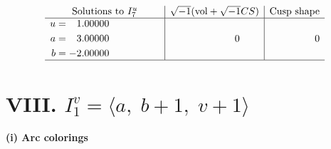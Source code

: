\documentclass[1p]{elsarticle_modified}
\theoremstyle{definition}
\newcommand{\I}{\sqrt{-1}}
\begin{document}
$$\begin{array}{c|c|c}  
\text{Solutions to }I^u_{7}& \I (\text{vol} + \sqrt{-1}CS) & \text{Cusp shape}\\
 \hline 
\begin{aligned}
u &= \phantom{-}1.00000\phantom{ +0.000000I} \\
a &= \phantom{-}3.00000\phantom{ +0.000000I} \\
b &= -2.00000\phantom{ +0.000000I}\end{aligned}
 & \phantom{-0.000000 } 0 & \phantom{-0.000000 } 0\\
 \hline 
 \end{array}$$\newpage\newpage\renewcommand{\arraystretch}{1}
\centering \section*{VIII. $I^v_{1}= \langle a,\;b+1,\;v+1 \rangle$}
\flushleft \textbf{(i) Arc colorings}\\
\end{document}
